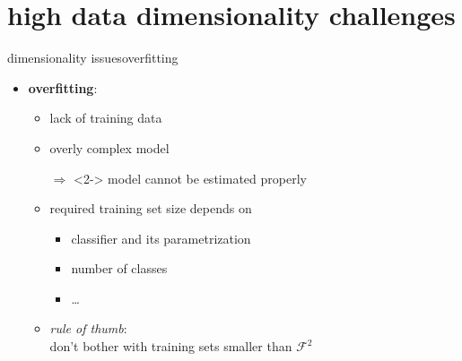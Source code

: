    \section[challenges]{high data dimensionality challenges}
		\begin{frame}{dimensionality issues}{overfitting}
            \vspace{-2mm}
            \begin{itemize}
                \item   \textbf{overfitting}:
                    \begin{itemize}
                        \item   lack of training data
                        \item   overly complex model
                        \item[$\Rightarrow$]<2-> model cannot be estimated properly
                    \end{itemize}
                    
                    \bigskip
                    \begin{itemize}
                        \item<3-> required training set size depends on 
                            \begin{itemize}
                                \item   classifier and its parametrization
                                \item   number of classes
                                \item   \ldots
                            \end{itemize}
                        \bigskip
                        \item<3-> \textit{rule of thumb}:\\ don't bother with training sets smaller than $\mathcal{F}^2$
                    \end{itemize}
                    \vspace{50mm}
			\end{itemize}
		\end{frame}
